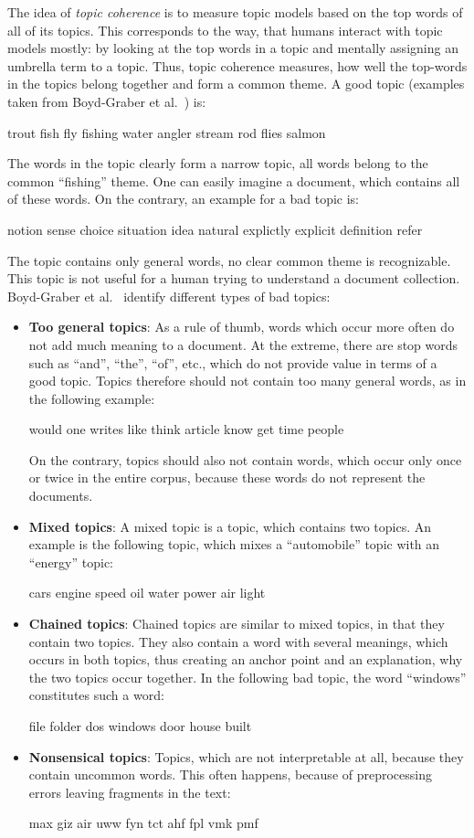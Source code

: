\documentclass[
        a4paper,
        titlepage,
        twoside,
        parskip,
        numbers=noenddot
        ]{scrbook}
\newcommand{\topicbox}[1]{
  \setlength{\OuterFrameSep}{0pt}
  \begin{framed}
    #1
  \end{framed}
}
\newcommand{\topicboxList}[1]{
  \setlength{\OuterFrameSep}{0pt}
  \newline
  \begin{minipage}{\linewidth}
    \vspace{6pt}
    \begin{framed}
      #1
    \end{framed}
    \vspace{6pt}
  \end{minipage}
}
\theoremstyle{break}
\begin{document}
The idea of \emph{topic coherence} is to measure topic models based on the top words of all of its topics.
This corresponds to the way, that humans interact with topic models mostly: by looking at the top words in a topic and mentally assigning an umbrella term to a topic.
Thus, topic coherence measures, how well the top-words in the topics belong together and form a common theme.
A good topic (examples taken from Boyd-Graber et al.~\cite{Boyd-graber2014}) is: \topicbox{trout fish fly fishing water angler stream rod flies salmon}
The words in the topic clearly form a narrow topic, all words belong to the common ``fishing'' theme.
One can easily imagine a document, which contains all of these words.
On the contrary, an example for a bad topic is:
\topicbox{notion sense choice situation idea natural explictly explicit definition refer}
The topic contains only general words, no clear common theme is recognizable.
This topic is not useful for a human trying to understand a document collection.
Boyd-Graber et al.~\cite{Boyd-graber2014} identify different types of bad topics:
\begin{itemize}
  \item
    \textbf{Too general topics}: As a rule of thumb, words which occur more often do not add much meaning to a document.
    At the extreme, there are stop words such as ``and'', ``the'', ``of'', etc., which do not provide value in terms of a good topic.
    Topics therefore should not contain too many general words, as in the following example:
    \topicboxList{would one writes like think article know get time people}
    On the contrary, topics should also not contain words, which occur only once or twice in the entire corpus, because these words do not represent the documents.
  \item
    \textbf{Mixed topics}: A mixed topic is a topic, which contains two topics.
    An example is the following topic, which mixes a ``automobile'' topic with an ``energy'' topic:
    \topicboxList{cars engine speed oil water power air light}
  \item
    \textbf{Chained topics}: Chained topics are similar to mixed topics, in that they contain two topics.
    They also contain a word with several meanings, which occurs in both topics, thus creating an anchor point and an explanation, why the two topics occur together.
    In the following bad topic, the word ``windows'' constitutes such a word:
    \topicboxList{file folder dos windows door house built}
  \item
    \textbf{Nonsensical topics}:
    Topics, which are not interpretable at all, because they contain uncommon words.
    This often happens, because of preprocessing errors leaving fragments in the text:
    \topicboxList{max giz air uww fyn tct ahf fpl vmk pmf}
\end{itemize}
\end{document}
